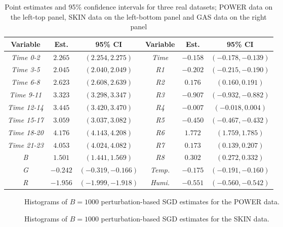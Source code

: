 \documentclass[twoside,11pt]{article}
\begin{document}
\begin{table}[!h]
	\centering
	\caption{Point estimates and 95\% confidence intervals for three real datasets; POWER data on the left-top panel, SKIN data on the left-bottom panel and GAS data on the right panel}
	\medskip
	\label{tab:real-data}
	\begin{tabular}{ccc|ccc}
		\hline
		Variable &Est. & 95\% CI & Variable &Est. & 95\% CI\\
		\hline\hline
		{\it Time 0-2} & $2.265$ & $(2.254,2.275)$ & {\it Time} & $-0.158$ & $(-0.178, -0.139)$\\
		{\it Time 3-5} & $2.045$ & $(2.040,2.049)$ & {\it R1} & $-0.202$ & $(-0.215, -0.190)$\\
		{\it Time 6-8} & $2.623$ & $(2.608,2.639)$ & {\it R2} & $0.176$ & $(0.160, 0.191)$ \\
		{\it Time 9-11} & $3.323$ & $(3.298,3.347)$ & {\it R3} & $-0.907$ & $(-0.932, -0.882)$\\
		{\it Time 12-14} & $3.445$ & $(3.420,3.470)$ & {\it R4} & $-0.007$ & $(-0.018, 0.004)$\\
		{\it Time 15-17} & $3.059$ & $(3.037,3.082)$ & {\it R5} & $-0.450$ & $(-0.467, -0.432)$\\
		{\it Time 18-20} & $4.176$ & $(4.143,4.208)$ & {\it R6} & $1.772$ & $(1.759, 1.785)$\\
		{\it Time 21-23} & $4.053$ & $(4.024,4.082)$ & {\it R7} & $0.173$ & $(0.139, 0.207)$\\
		\cline{1-3}
		{\it B} & $1.501$ & $(1.441,1.569)$ & {\it R8} & $0.302$ & $(0.272, 0.332)$    \\
		{\it G} & $-0.242$ & $(-0.319,-0.166)$ &  {\it Temp.} & $-0.175$ & $(-0.191, -0.160)$ \\
		{\it R} & $-1.956$ & $(-1.999,-1.918)$ &  {\it Humi.} & $-0.551$ & $(-0.560, -0.542)$\\
		\hline
	\end{tabular}
\end{table}


\begin{figure}[htb]
	\centering
	\label{fig:fig-real-linear}
	\caption{Histograms of $B=1000$ perturbation-based SGD estimates for the POWER data. }
\end{figure}

\begin{figure}[htb]
	\centering
	\label{fig:fig-real-glm-1}
	\caption{Histograms of $B=1000$ perturbation-based SGD estimates for the SKIN data. }
\end{figure}
\end{document}
